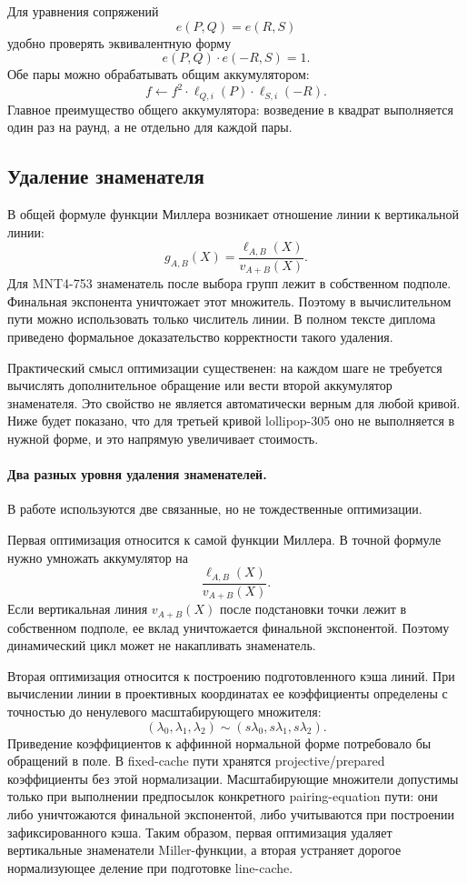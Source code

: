\documentclass[12pt,a4paper]{article}
\begin{document}
Для уравнения сопряжений
\[
    e(P,Q)=e(R,S)
\]
удобно проверять эквивалентную форму
\[
    e(P,Q)\cdot e(-R,S)=1.
\]
Обе пары можно обрабатывать общим аккумулятором:
\[
    f \leftarrow
    f^2\cdot \ell_{Q,i}(P)\cdot \ell_{S,i}(-R).
\]
Главное преимущество общего аккумулятора: возведение в квадрат выполняется
один раз на раунд, а не отдельно для каждой пары.

\subsection{Удаление знаменателя}

В общей формуле функции Миллера возникает отношение линии к вертикальной
линии:
\[
    g_{A,B}(X)=\frac{\ell_{A,B}(X)}{v_{A+B}(X)}.
\]
Для MNT4-753 знаменатель после выбора групп лежит в собственном подполе.
Финальная экспонента уничтожает этот множитель. Поэтому в вычислительном пути
можно использовать только числитель линии. В полном тексте диплома приведено
формальное доказательство корректности такого удаления.

Практический смысл оптимизации существенен: на каждом шаге не требуется
вычислять дополнительное обращение или вести второй аккумулятор знаменателя.
Это свойство не является автоматически верным для любой кривой. Ниже будет
показано, что для третьей кривой lollipop-305 оно не выполняется в нужной
форме, и это напрямую увеличивает стоимость.

\paragraph{Два разных уровня удаления знаменателей.}
В работе используются две связанные, но не тождественные оптимизации.

Первая оптимизация относится к самой функции Миллера. В точной формуле нужно
умножать аккумулятор на
\[
    \frac{\ell_{A,B}(X)}{v_{A+B}(X)}.
\]
Если вертикальная линия $v_{A+B}(X)$ после подстановки точки лежит в
собственном подполе, ее вклад уничтожается финальной экспонентой. Поэтому
динамический цикл может не накапливать знаменатель.

Вторая оптимизация относится к построению подготовленного кэша линий.
При вычислении линии в проективных координатах ее коэффициенты определены с
точностью до ненулевого масштабирующего множителя:
\[
    (\lambda_0,\lambda_1,\lambda_2)
    \sim
    (s\lambda_0,s\lambda_1,s\lambda_2).
\]
Приведение коэффициентов к аффинной нормальной форме потребовало бы обращений
в поле. В fixed-cache пути хранятся projective/prepared коэффициенты без этой
нормализации. Масштабирующие множители допустимы только при выполнении
предпосылок конкретного pairing-equation пути: они либо уничтожаются
финальной экспонентой, либо учитываются при построении зафиксированного
кэша. Таким образом, первая оптимизация удаляет вертикальные знаменатели
Miller-функции, а вторая устраняет дорогое нормализующее деление при
подготовке line-cache.
\end{document}
